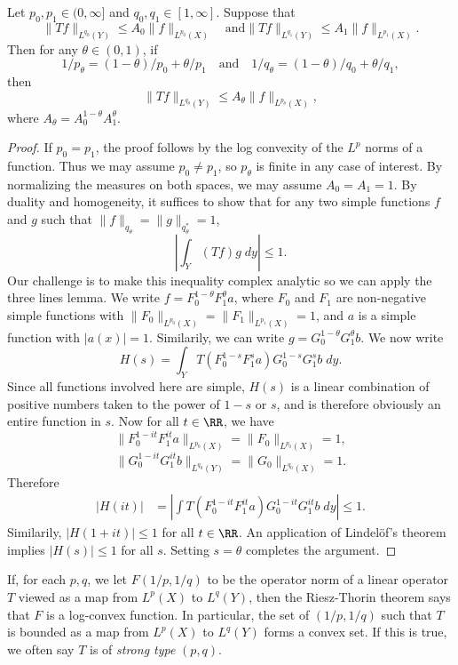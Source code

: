 \begin{theorem}
    Let $p_0,p_1 \in (0,\infty]$ and $q_0,q_1 \in [1,\infty]$. Suppose that
    \[ \| Tf \|_{L^{q_0}(Y)} \leq A_0 \| f \|_{L^{p_0}(X)} \quad \text{and} \| Tf \|_{L^{q_1}(Y)} \leq A_1 \| f \|_{L^{p_1}(X)}.  \]
    Then for any $\theta \in (0,1)$, if
    \[ 1/p_\theta = (1 - \theta)/p_0 + \theta/p_1 \quad\text{and}\quad 1/q_\theta = (1 - \theta)/q_0 + \theta/q_1, \]
    then
    \[ \| Tf \|_{L^{q_\theta}(Y)} \leq A_\theta \| f \|_{L^{p_\theta}(X)}, \]
    where $A_\theta = A_0^{1 - \theta} A_1^\theta$.
\end{theorem}
\begin{proof}
    If $p_0 = p_1$, the proof follows by the log convexity of the $L^p$ norms of a function. Thus we may assume $p_0 \neq p_1$, so $p_\theta$ is finite in any case of interest. By normalizing the measures on both spaces, we may assume $A_0 = A_1 = 1$. By duality and homogeneity, it suffices to show that for any two simple functions $f$ and $g$ such that $\| f \|_{q_\theta} = \| g \|_{q_\theta^*} = 1$,
    \[ \left| \int_Y (Tf) g\; dy \right| \leq 1. \]
    Our challenge is to make this inequality complex analytic so we can apply the three lines lemma. We write $f = F_0^{1 - \theta} F_1^\theta a$, where $F_0$ and $F_1$ are non-negative simple functions with $\| F_0 \|_{L^{p_0}(X)} = \| F_1 \|_{L^{p_1}(X)} = 1$, and $a$ is a simple function with $|a(x)| = 1$. Similarily, we can write $g = G_0^{1-\theta} G_1^\theta b$. We now write
    \[ H(s) = \int_Y T(F_0^{1 - s} F_1^s a) G_0^{1-s} G_1^s b\; dy. \]
    Since all functions involved here are simple, $H(s)$ is a linear combination of positive numbers taken to the power of $1-s$ or $s$, and is therefore obviously an entire function in $s$. Now for all $t \in \RR$, we have
    \[ \| F_0^{1-it} F_1^{it} a \|_{L^{p_0}(X)} = \| F_0 \|_{L^{p_0}(X)} = 1, \]
    \[ \| G_0^{1-it} G_1^{it} b \|_{L^{q_0}(Y)} = \| G_0 \|_{L^{q_0}(X)} = 1. \]
    Therefore
    \begin{align*}
      |H(it)| &= \left| \int T(F_0^{1 - it} F_1^{it} a) G_0^{1-it} G_1^{it} b\; dy \right| \leq 1.
    \end{align*}
    Similarily, $|H(1 + it)| \leq 1$ for all $t \in \RR$. An application of Lindel\"{o}f's theorem implies $|H(s)| \leq 1$ for all $s$. Setting $s = \theta$ completes the argument.
\end{proof}

If, for each $p,q$, we let $F(1/p,1/q)$ to be the operator norm of a linear operator $T$ viewed as a map from $L^p(X)$ to $L^q(Y)$, then the Riesz-Thorin theorem says that $F$ is a log-convex function. In particular, the set of $(1/p,1/q)$ such that $T$ is bounded as a map from $L^p(X)$ to $L^q(Y)$ forms a convex set. If this is true, we often say $T$ is of \emph{strong type} $(p,q)$.

